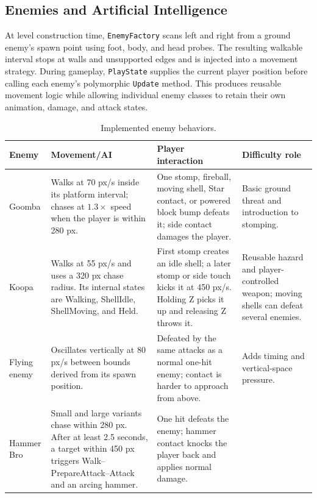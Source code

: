 \documentclass{template}
\begin{document}
\subsection{Enemies and Artificial Intelligence}

At level construction time, \texttt{EnemyFactory} scans left and right from a
ground enemy's spawn point using foot, body, and head probes. The resulting
walkable interval stops at walls and unsupported edges and is injected into a
movement strategy. During gameplay, \texttt{PlayState} supplies the current
player position before calling each enemy's polymorphic \texttt{Update}
method. This produces reusable movement logic while allowing individual enemy
classes to retain their own animation, damage, and attack states.

\begin{table}[htbp]
    \centering
    \caption{Implemented enemy behaviors.}
    \label{tab:enemies}
    \small
    \begin{tabularx}{\textwidth}{@{}p{2.25cm}XXX@{}}
        \toprule
        \textbf{Enemy} & \textbf{Movement/AI} & \textbf{Player interaction} &
        \textbf{Difficulty role} \\
        \midrule
        Goomba & Walks at 70 px/s inside its platform interval; chases at
        $1.3\times$ speed when the player is within 280 px. & One stomp,
        fireball, moving shell, Star contact, or powered block bump defeats it;
        side contact damages the player. & Basic ground threat and introduction
        to stomping. \\
        Koopa & Walks at 55 px/s and uses a 320 px chase radius. Its internal
        states are Walking, ShellIdle, ShellMoving, and Held. & First stomp
        creates an idle shell; a later stomp or side touch kicks it at 450 px/s.
        Holding Z picks it up and releasing Z throws it. & Reusable hazard and
        player-controlled weapon; moving shells can defeat several enemies. \\
        Flying enemy & Oscillates vertically at 80 px/s between bounds derived
        from its spawn position. & Defeated by the same attacks as a normal
        one-hit enemy; contact is harder to approach from above. & Adds timing
        and vertical-space pressure. \\
        Hammer Bro & Small and large variants chase within 280 px. After at
        least 2.5 seconds, a target within 450 px triggers
        Walk--PrepareAttack--Attack and an arcing hammer. & One hit defeats the
        enemy; hammer contact knocks the player back and applies normal damage.

\end{tabularx}
\end{table}
\end{document}
